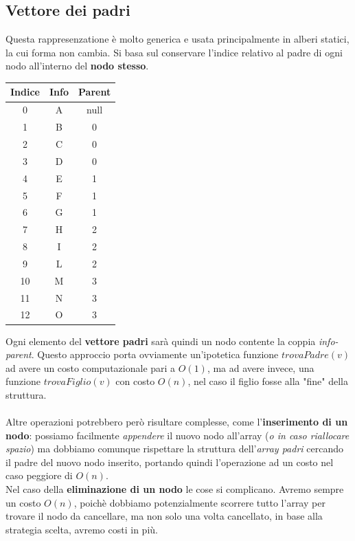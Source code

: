 \documentclass{article}
\begin{document}
\subsection*{Vettore dei padri}
Questa rappresenzatione è molto generica e usata principalmente in alberi statici, la cui forma 
non cambia. Si basa sul conservare l'indice relativo al padre
di ogni nodo all'interno del \textbf{nodo stesso}.

\begin{table}[htbp]
  \centering
  \begin{tabular}{c c c}
    \toprule
    \textbf{Indice} & \textbf{Info} & \textbf{Parent} \\
    \midrule
    0  & A & null \\
    1  & B & 0    \\
    2  & C & 0    \\
    3  & D & 0    \\
    4  & E & 1    \\
    5  & F & 1    \\
    6  & G & 1    \\
    7  & H & 2    \\
    8  & I & 2    \\
    9  & L & 2    \\
    10 & M & 3    \\
    11 & N & 3    \\
    12 & O & 3    \\
    \bottomrule
  \end{tabular}
  \label{tab:albero-vettore}
\end{table}

Ogni elemento del \textbf{vettore padri} sarà quindi un nodo contente la coppia 
\textit{info-parent}. Questo approccio porta ovviamente un'ipotetica funzione $trovaPadre(v)$
ad avere un costo computazionale pari a $O(1)$, ma ad avere invece, una funzione $trovaFiglio(v)$
con costo $O(n)$, nel caso il figlio fosse alla "fine" della struttura.
\\
\\
Altre operazioni potrebbero però risultare complesse, come l'\textbf{inserimento di un nodo}: 
possiamo facilmente \textit{appendere} il nuovo nodo all'array (\textit{o in caso riallocare spazio})
ma dobbiamo comunque rispettare la struttura dell'\textit{array padri} cercando il padre del nuovo 
nodo inserito, portando quindi l'operazione ad un costo nel caso peggiore di $O(n)$. \\
Nel caso della \textbf{eliminazione di un nodo} le cose si complicano. Avremo sempre un costo $O(n)$,
poichè dobbiamo potenzialmente scorrere tutto l'array per trovare il nodo da cancellare, ma non solo
una volta cancellato, in base alla strategia scelta, avremo costi in più. 
\end{document}
